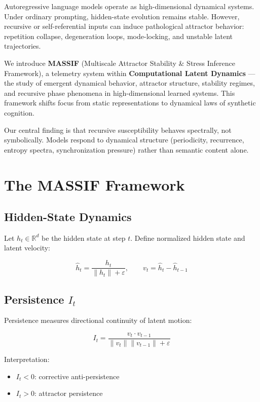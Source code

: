 \documentclass{article}
\begin{document}
Autoregressive language models operate as high-dimensional dynamical systems. Under ordinary prompting, hidden-state evolution remains stable. However, recursive or self-referential inputs can induce pathological attractor behavior: repetition collapse, degeneration loops, mode-locking, and unstable latent trajectories.

We introduce \textbf{MASSIF} (Multiscale Attractor Stability \& Stress Inference Framework), a telemetry system within \textbf{Computational Latent Dynamics} — the study of emergent dynamical behavior, attractor structure, stability regimes, and recursive phase phenomena in high-dimensional learned systems. This framework shifts focus from static representations to dynamical laws of synthetic cognition.

Our central finding is that recursive susceptibility behaves spectrally, not symbolically. Models respond to dynamical structure (periodicity, recurrence, entropy spectra, synchronization pressure) rather than semantic content alone.

\section{The MASSIF Framework}

\subsection{Hidden-State Dynamics}

Let $h_t \in \mathbb{R}^d$ be the hidden state at step $t$. Define normalized hidden state and latent velocity:

$$\hat{h}_t = \frac{h_t}{\|h_t\| + \varepsilon}, \qquad v_t = \hat{h}_t - \hat{h}_{t-1}$$

\subsection{Persistence $I_t$}

Persistence measures directional continuity of latent motion:

$$I_t = \frac{v_t \cdot v_{t-1}}{\|v_t\| \|v_{t-1}\| + \varepsilon}$$

Interpretation:
\begin{itemize}
    \item $I_t < 0$: corrective anti-persistence
    \item $I_t > 0$: attractor persistence
\end{itemize}
\end{document}
